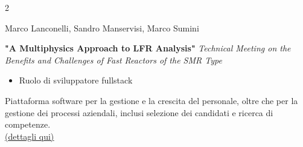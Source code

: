 \documentclass[10pt,a4paper,ragged2e,withhyper]{altacv}
\begin{document}
\begin{paracol}{2}
\divider


\divider


Marco Lanconelli, Sandro Manservisi, Marco Sumini 

\textbf{"A Multiphysics Approach to LFR Analysis"} \textit{Technical Meeting on the Benefits and Challenges of Fast Reactors of the SMR Type}



\newpage



\switchcolumn



\begin{itemize}
    \item Ruolo di sviluppatore fullstack
\end{itemize}
Piattaforma software per la gestione e la crescita del personale, oltre che per la gestione dei processi aziendali, inclusi selezione dei candidati e ricerca di competenze. \\
\href{https://www.niering.it/software-gestionali-hr-le-nuove-funzionalita-di-matriskills/}{(\underline{dettagli qui)}}


\end{paracol}
\end{document}
